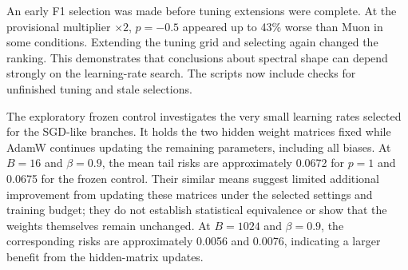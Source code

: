 \documentclass[11pt,a4paper]{article}
\begin{document}
An early F1 selection was made before tuning extensions were complete. At the provisional multiplier $\times2$, $p=-0.5$ appeared up to 43\% worse than Muon in some conditions. Extending the tuning grid and selecting again changed the ranking. This demonstrates that conclusions about spectral shape can depend strongly on the learning-rate search. The scripts now include checks for unfinished tuning and stale selections.

The exploratory frozen control investigates the very small learning rates selected for the SGD-like branches. It holds the two hidden weight matrices fixed while AdamW continues updating the remaining parameters, including all biases. At $B=16$ and $\beta=0.9$, the mean tail risks are approximately 0.0672 for $p=1$ and 0.0675 for the frozen control. Their similar means suggest limited additional improvement from updating these matrices under the selected settings and training budget; they do not establish statistical equivalence or show that the weights themselves remain unchanged. At $B=1024$ and $\beta=0.9$, the corresponding risks are approximately 0.0056 and 0.0076, indicating a larger benefit from the hidden-matrix updates.



\FloatBarrier
\end{document}
